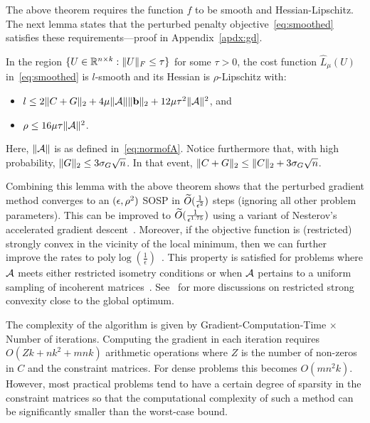 The above theorem requires the function $f$ to be smooth and Hessian-Lipschitz. The next lemma states that the perturbed penalty objective~\eqref{eq:smoothed} satisfies these requirements---proof in Appendix~\ref{apdx:gd}. %
\begin{lemma}\label{lem:gd_param}
In the region $\{U \in \mathbb{R}^{n\times k} : \|U\|_F \leq \tau \}$ for some $\tau > 0$, the cost function $\hat L_\mu(U)$ in~\eqref{eq:smoothed} is $l$-smooth and its Hessian is $\rho$-Lipschitz with:
\begin{itemize} 
	\item $l \leq 2\|C+G\|_2 + 4 \mu \|\mathcal{A}\| \|\mathbf{b}\|_2 + 12 \mu \tau^2 \|\mathcal{A}\|^2$, and
	\item $\rho \leq 16\mu \tau \|\mathcal{A}\|^2$.
\end{itemize}
Here, $\|\mathcal{A}\|$ is as defined in~\eqref{eq:normofA}. Notice furthermore that, with high probability, $\|G\|_2 \leq 3\sigma_G\sqrt{n}$. In that event, $\|C+G\|_2 \leq \|C\|_2 + 3\sigma_G\sqrt{n}$.
\end{lemma}

Combining this lemma with the above theorem shows that the perturbed gradient method converges to an $(\epsilon, \rho^2)$ SOSP in $\widetilde{O}(\frac{1}{\epsilon^2})$ steps (ignoring all other problem parameters). This can be improved to $\widetilde{O}(\frac{1}{\epsilon^{1.75}})$ using a variant of Nesterov's accelerated gradient descent~\citep{jin2017accelerated}. 
Moreover, if the objective function is (restricted) strongly convex in the vicinity of the local minimum, then we can further improve the rates to $\textrm{poly} \log\left(\frac{1}{\epsilon}\right)$~\citep{jin2017escape}. This property is satisfied for problems where $\mathcal{A}$ meets either restricted isometry conditions or when $\mathcal{A}$ pertains to a uniform sampling of incoherent matrices~\citep{agarwal2010fast, negahban2012restricted,sun2014guaranteed}. See~\citep{bhojanapalli2016dropping} for more discussions on restricted strong convexity close to the global optimum.

The complexity of the algorithm is given by Gradient-Computation-Time $\times $ Number of iterations. Computing the gradient in each iteration requires $O\left(Zk+nk^2 + mnk \right)$ arithmetic operations where $Z$ is the number of non-zeros in $C$ and the constraint matrices. For dense problems this becomes $O\left( mn^2k \right)$. However, most practical problems tend to have a certain degree of sparsity in the constraint matrices so that the computational complexity of such a method can be significantly smaller than the worst-case bound.
